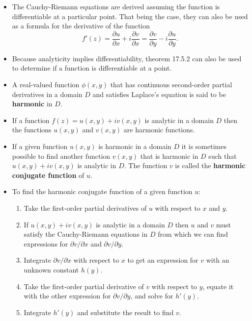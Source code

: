 \documentclass{article}
\begin{document}
\begin{itemize}
  \item The Cauchy-Riemann equations are derived assuming the function is differentiable at a particular point. That being the case, they can also be used as a formula for the derivative of the function \[f'(z) = \frac{\partial u}{\partial x} + i \frac{\partial v}{\partial x} = \frac{\partial v}{\partial y} - i \frac{\partial u}{\partial y}.\]

  \item Because analyticity implies differentiability, theorem 17.5.2 can also be used to determine if a function is differentiable at a point.

  \item A real-valued function $\phi(x, y)$ that has continuous second-order partial derivatives in a domain $D$ and satisfies Laplace's equation is said to be \textbf{harmonic} in $D$.

  \item If a function $f(z) = u(x, y) + i v(x, y)$ is analytic in a domain $D$ then the functions $u(x, y)$ and $v(x, y)$ are harmonic functions.

  \item If a given function $u(x, y)$ is harmonic in a domain $D$ it is sometimes possible to find another function $v(x, y)$ that is harmonic in $D$ such that $u(x, y) + i v(x, y)$ is analytic in $D$. The function $v$ is called the \textbf{harmonic conjugate function} of $u$.

  \item To find the harmonic conjugate function of a given function $u$:

        \begin{enumerate}
          \item Take the first-order partial derivatives of $u$ with respect to $x$ and $y$.

          \item If $u(x, y) + i v(x, y)$ is analytic in a domain $D$ then $u$ and $v$ must satisfy the Cauchy-Riemann equations in $D$ from which we can find expressions for $\partial v / \partial x$ and $\partial v / \partial y$.

          \item Integrate $\partial v / \partial x$ with respect to $x$ to get an expression for $v$ with an unknown constant $h(y)$.

          \item Take the first-order partial derivative of $v$ with respect to $y$, equate it with the other expression for $\partial v / \partial y$, and solve for $h'(y)$.

          \item Integrate $h'(y)$ and substitute the result to find $v$.
        \end{enumerate}
\end{itemize}
\end{document}

